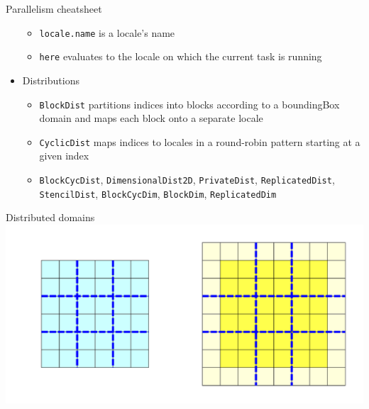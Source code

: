 \documentclass[10pt,xcolor=pdftex,dvipsnames,table]{beamer}
\newcommand{\tc}{\textcolor}
\begin{document}
\begin{frame}{Parallelism cheatsheet}
\begin{itemize}
\begin{itemize}
    \item \tc{Mahogany}{\texttt{locale.name}} is a locale's name
    \item \tc{Mahogany}{\texttt{here}} evaluates to the locale on which the current task is running
    \end{itemize}
  \item Distributions
    \begin{itemize}\setlength{\itemsep}{0.1mm}
    \item \tc{Mahogany}{\texttt{BlockDist}} partitions indices into blocks according to a boundingBox
      domain and maps each block onto a separate locale
    \item \tc{Mahogany}{\texttt{CyclicDist}} maps indices to locales in a round-robin pattern
      starting at a given index
    \item \tc{Mahogany}{\texttt{BlockCycDist}}, \tc{Mahogany}{\texttt{DimensionalDist2D}},
      \tc{Mahogany}{\texttt{PrivateDist}}, \tc{Mahogany}{\texttt{ReplicatedDist}},
      \tc{Mahogany}{\texttt{StencilDist}}, \tc{Mahogany}{\texttt{BlockCycDim}},
      \tc{Mahogany}{\texttt{BlockDim}}, \tc{Mahogany}{\texttt{ReplicatedDim}}
    \end{itemize}
  \end{itemize}
\end{frame}



\begin{frame}{Distributed domains}
  \includegraphics[width=1.0\columnwidth]{domains.pdf}
\end{frame}
\end{document}
